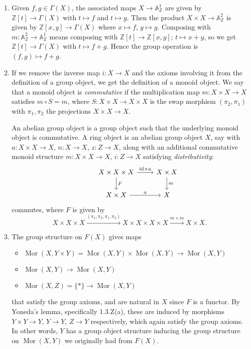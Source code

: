 \documentclass{report}
\newcommand{\id}{{\mathrm{id}}} %
\newcommand{\A}{\mathbb{A}}
\newcommand{\Z}{\mathbb{Z}}
\DeclareMathOperator{\Mor}{Mor}
\begin{document}
\begin{enumerate}[label=\textbf{6.6.\Alph*.}]
	\item Given $f,g\in\Gamma(X)$, the associated maps $X\to\A^1_\Z$ are given
	      by $\Z[t]\to\Gamma(X)$ with $t\mapsto f$ and $t\mapsto g$. Then the
	      product $X\times X\to\A^2_\Z$ is given by $\Z[x,y]\to\Gamma(X)$ where
	      $x\mapsto f$, $y\mapsto g$. Composing with $m:\A^2_\Z\to\A^1_\Z$ means
	      composing with $\Z[t]\to\Z[x,y]$; $t\mapsto x+y$, so we get
	      $\Z[t]\to\Gamma(X)$ with $t\mapsto f+g$. Hence the group operation is
	      $(f,g)\mapsto f+g$.

	\item If we remove the inverse map $i:X\to X$ and the axioms involving it
	      from the definition of a group object, we get the definition of a
	      monoid object. We say that a monoid object is \emph{commutative} if
	      the multiplication map $m:X\times X\to X$ satisfies $m\circ S=m$,
	      where $S:X\times X\to X\times X$ is the swap morphism $(\pi_2,\pi_1)$
	      with $\pi_1,\pi_2$ the projections $X\times X\to X$.

	      An abelian group object is a group object such that the underlying
	      monoid object is commutative. A ring object is an abelian group object
	      $X$, say with $a:X\times X\to X$, $n:X\to X$, $z:Z\to X$, along with
	      an additional commutative monoid structure $m:X\times X\to X$,
	      $i:Z\to X$ satisfying \emph{distributivity}:
	      \begin{equation*}
		      \begin{tikzcd}
			      &X\times X\times X \arrow{r}{\id\times a} \arrow{d}{F}
			      &X\times X \arrow{d}{m} \\
			      &X\times X \arrow{r}{a}
			      &X
		      \end{tikzcd}
	      \end{equation*}
	      commutes, where $F$ is given by
	      \begin{equation*}
		      X\times X\times X
		      \xrightarrow{(\pi_1,\pi_2,\pi_1,\pi_3)} X\times X\times X\times X
		      \xrightarrow{m\times m} X\times X.
	      \end{equation*}

	\item The group structure on $F(X)$ gives maps
	      \begin{itemize}
		      \item $\Mor(X,Y\times Y) = \Mor(X,Y)\times\Mor(X,Y) \to \Mor(X,Y)$
		      \item $\Mor(X,Y) \to \Mor(X,Y)$
		      \item $\Mor(X,Z) = \{*\} \to \Mor(X,Y)$
	      \end{itemize}
	      that satisfy the group axioms, and are natural in $X$ since $F$ is a
	      functor. By Yoneda's lemma, specifically 1.3.Z(a), these are induced
	      by morphisms $Y\times Y\to Y$, $Y\to Y$, $Z\to Y$ respectively, which
	      again satisfy the group axioms. In other words, $Y$ has a group object
	      structure inducing the group structure on $\Mor(X,Y)$ we originally
	      had from $F(X)$.


\end{enumerate}
\end{document}
